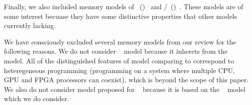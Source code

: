 
Finally, we also included memory models of \OCaml~(\OCMM)~\cite{Dolan-al:PLDI18}
and \JS/\WASM~(\JSMM)~\cite{Watt-el:PLDI2020}.
These models are of some interest becuase 
they have some distinctive properties
that other models currently lacking.

We have consciously excluded several memory models from our review
for the following reasons.
We do not consider \OpenCL~\cite{Batty-el:POPL16} model 
because it inherets from the \CPP model.
All of the distinguished features of \OpenCL model comparing to \CPP
correspond to heteregeneous programming 
(\ie programming on a system where multiple CPU, GPU and FPGA processors can coexist),
which is beyond the scope of this paper. 
We also do not consider model proposed for \LLVM~\cite{Chakraborty-Vafeiadis:CGO17}
because it is based on the \Weakest~\cite{Chakraborty-Vafeiadis:POPL19} 
model which we do consider. 



